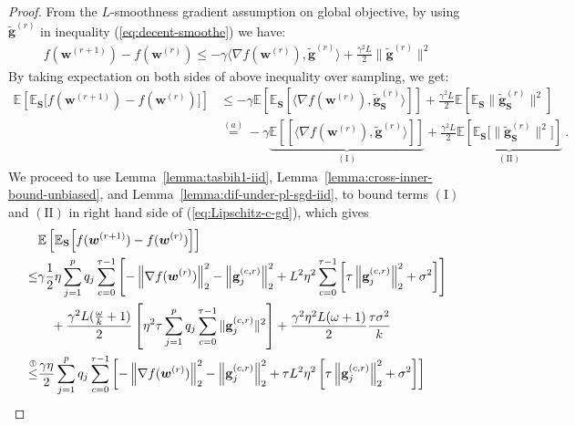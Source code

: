 \documentclass[11pt]{article}
\begin{document}
\begin{proof}
From the $L$-smoothness gradient assumption on global objective, by using  $\tilde{\mathbf{g}}^{(r)}$ in inequality (\ref{eq:decent-smoothe}) we have:
\begin{align}
    f({\boldsymbol{w}}^{(r+1)})-f({\boldsymbol{w}}^{(r)})\leq -\gamma \big\langle\nabla f({\boldsymbol{w}}^{(r)}),\tilde{\mathbf{g}}^{(r)}\big\rangle+\frac{\gamma^2 L}{2}\|\tilde{\mathbf{g}}^{(r)}\|^2\label{eq:Lipschitz-c1}
\end{align}
By taking expectation on both sides of above inequality over sampling, we get:
\begin{align}
    \mathbb{E}\left[\mathbb{E}_\mathbf{S}\Big[f({\boldsymbol{w}}^{(r+1)})-f({\boldsymbol{w}}^{(r)})\Big]\right]&\leq -\gamma\mathbb{E}\left[\mathbb{E}_\mathbf{S}\left[ \big\langle\nabla f({\boldsymbol{w}}^{(r)}),\tilde{\mathbf{g}}_\mathbf{S}^{(r)}\big\rangle\right]\right]+\frac{\gamma^2 L}{2}\mathbb{E}\left[\mathbb{E}_\mathbf{S}\|\tilde{\mathbf{g}}_\mathbf{S}^{(r)}\|^2\right]\nonumber\\
    &\stackrel{(a)}{=}-\gamma\underbrace{\mathbb{E}\left[\left[ \big\langle\nabla f({\boldsymbol{w}}^{(r)}),\tilde{\mathbf{g}}^{(r)}\big\rangle\right]\right]}_{(\mathrm{I})}+\frac{\gamma^2 L}{2}\underbrace{\mathbb{E}\left[\mathbb{E}_\mathbf{S}\Big[\|\tilde{\mathbf{g}}_\mathbf{S}^{(r)}\|^2\Big]\right]}_{\mathrm{(II)}} \ . \label{eq:Lipschitz-c-gd}
\end{align}
We proceed to use Lemma~\ref{lemma:tasbih1-iid}, Lemma~\ref{lemma:cross-inner-bound-unbiased}, and Lemma~\ref{lemma:dif-under-pl-sgd-iid}, to bound  terms $(\mathrm{I})$ and $(\mathrm{II})$ in right hand side of (\ref{eq:Lipschitz-c-gd}), which gives
\begin{align}
     &\mathbb{E}\left[\mathbb{E}_{\mathbf{S}}\Big[f({\boldsymbol{w}}^{(r+1)})-f({\boldsymbol{w}}^{(r)})\Big]\right]\nonumber\\
     \leq& \gamma\frac{1}{2}\eta\sum_{j=1}^pq_j\sum_{c=0}^{\tau-1}\left[-\left\|\nabla f({\boldsymbol{w}}^{(r)})\right\|_2^2-\left\|\mathbf{g}_j^{(c,r)}\right\|_2^2+L^2\eta^2\sum_{c=0}^{\tau-1}\left[\tau\left\|{\mathbf{g}}_j^{(c,r)}\right\|_2^2+\sigma^2\right]\right]\nonumber\\
     &\quad+\frac{\gamma^2 L(\frac{\omega}{k}+1)}{2}\left[{\eta^2\tau}\sum_{j=1}^pq_j\sum_{c=0}^{\tau-1}\|\mathbf{g}^{(c,r)}_{j}\|^2\right]+\frac{\gamma^2\eta^2 L(\omega+1)}{2}\frac{\tau \sigma^2}{k}\nonumber\\
     \stackrel{\text{\ding{192}}}{\leq}&\frac{\gamma\eta}{2}\sum_{j=1}^pq_j\sum_{c=0}^{\tau-1}\left[-\left\|\nabla f({\boldsymbol{w}}^{(r)})\right\|_2^2-\left\|\mathbf{g}_j^{(c,r)}\right\|_2^2+\tau L^2\eta^2\left[\tau\left\|{\mathbf{g}}_j^{(c,r)}\right\|_2^2+\sigma^2\right]\right]\nonumber\\

\end{align}
\end{proof}
\end{document}
